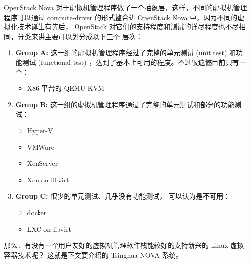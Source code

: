 OpenStack Nova 对于虚拟机管理程序做了一个抽象层，这样，不同的虚拟机管理程序可以通过
compute-driver 的形式整合进 OpenStack Nova 中。因为不同的虚拟化技术诞生有先后，
OpenStack 对它们的支持程度和测试的详尽程度也不尽相同，分类来讲主要可以划分成以下三个
层次：

\begin{enumerate}
    \item \textbf{Group A:} 这一组的虚拟机管理程序经过了完整的单元测试 (unit test)
    和功能测试 (functional test) ，达到了基本上可用的程度。不过很遗憾目前只有一个：
    \begin{itemize}
        \item X86 平台的 QEMU-KVM
    \end{itemize}
    \item \textbf{Group B:} 这一组的虚拟机管理程序通过了完整的单元测试和部分的功能测试：
    \begin{itemize}
        \item Hyper-V
        \item VMWare
        \item XenServer
        \item Xen on libvirt
    \end{itemize}
    \item \textbf{Group C:} 很少的单元测试、几乎没有功能测试，
    可以认为是\textbf{不可用}：
    \begin{itemize}
        \item docker
        \item LXC on libvirt
    \end{itemize}
\end{enumerate}

那么，有没有一个用户友好的虚拟机管理软件栈能较好的支持新兴的 Linux 虚拟容器技术呢？
这就是下文要介绍的 Tsinghua NOVA 系统。
